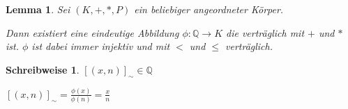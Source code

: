 \documentclass[twocolumn]{article}
\newtheorem{lemma}[theorem]{Lemma}
\newtheorem*{schreibweise}{Schreibweise}
\begin{document}
\begin{lemma}
	Sei $(K,+,*,P)$ ein beliebiger angeordneter Körper.
	
	Dann existiert eine eindeutige Abbildung $\phi : \mathbb{Q}\rightarrow K$ die verträglich mit $+$ und $*$ ist. $\phi$ ist dabei immer injektiv und mit $<$ und $\leq$ verträglich.
\end{lemma}

\begin{schreibweise}
	$[(x,n)]_{\sim} \in \mathbb{Q}$
	
	$[(x,n)]_{\sim} = \frac{\phi(x)}{\phi(n)} = \frac{x}{n}$
\end{schreibweise}
\end{document}
